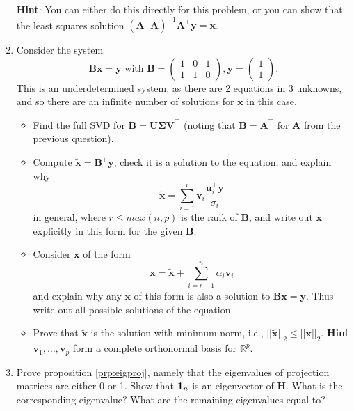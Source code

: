 \documentclass[]{book}
\providecommand{\tightlist}{%
  \setlength{\itemsep}{0pt}\setlength{\parskip}{0pt}}
\theoremstyle{definition}
\theoremstyle{definition}
\theoremstyle{definition}
\theoremstyle{remark}
\begin{document}
\begin{enumerate}
  \textbf{Hint}: You can either do this directly for this problem, or you can show that the least squares solution \((\mathbf A^\top \mathbf A)^{-1}\mathbf A^\top \mathbf y=\tilde{\mathbf x}\).
\item
  Consider the system
  \[\mathbf B\mathbf x= \mathbf y\mbox{ with }\mathbf B=\left(\begin{array}{ccc}1&0&1\\1&1&0\end{array}
  \right),\mathbf y= \left(\begin{array}{c}1\\1\end{array}
  \right).\]
  This is an underdetermined system, as there are 2 equations in 3 unknowns, and so there are an infinite number of solutions for \(\mathbf x\) in this case.

  \begin{itemize}
  \tightlist
  \item
    Find the full SVD for \(\mathbf B=\mathbf U\boldsymbol{\Sigma}\mathbf V^\top\) (noting that \(\mathbf B=\mathbf A^\top\) for \(\mathbf A\) from the previous question).
  \item
    Compute
    \(\tilde{\mathbf x}=\mathbf B^+\mathbf y\), check it is a solution to the equation, and explain why \[\tilde{\mathbf x}= \sum_{i=1}^r \mathbf v_i \frac{\mathbf u_i^\top \mathbf y}{\sigma_i}\] in general, where \(r\leq max(n,p)\) is the rank of \(\mathbf B\), and write out \(\tilde{\mathbf x}\) explicitly in this form for the given \(\mathbf B\).
  \item
    Consider \(\mathbf x\) of the form
    \[\mathbf x= \tilde{\mathbf x} + \sum_{i=r+1}^n \alpha_i \mathbf v_i\]
    and explain why any \(\mathbf x\) of this form is also a solution to \(\mathbf B\mathbf x=\mathbf y\). Thus write out all possible solutions of the equation.
  \item
    Prove that \(\tilde{\mathbf x}\) is the solution with minimum norm, i.e., \(||\tilde{\mathbf x}||_2 \leq ||\mathbf x||_2\). \textbf{Hint} \(\mathbf v_1, \ldots, \mathbf v_p\) form a complete orthonormal basis for \(\mathbb{R}^p\).
  \end{itemize}
\item
  Prove proposition \ref{prp:eigproj}, namely that the eigenvalues of projection matrices are either 0 or 1.
  Show that \({\bf 1}_n\) is an eigenvector of \(\mathbf H\). What is the corresponding eigenvalue? What are the remaining eigenvalues equal to?
\end{enumerate}
\end{document}
